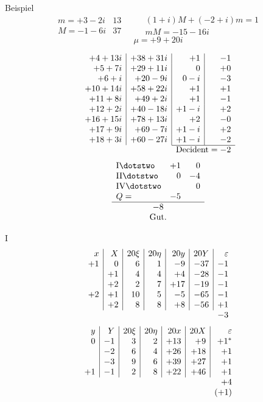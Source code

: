 Beispiel
\[
\begin{array}{r|r}
m=+3-2i&13\\
M=-1-6i&37
\end{array}
\qquad
\begin{gathered}
(1+i)M+(-2+i)m=1\\
mM=-15-16i
\end{gathered}
\]
\[
\mu=+9+20i
\]

\[
\begin{array}{r|r|r|r}
+4+13i&+38+31i&+1&-1\\
+5+7i&+29+11i&0&+0\\
+6+i&+20-9i&0-i&-3\\
+10+14i&+58+22i&+1&+1\\
+11+8i&+49+2i&+1&-1\\
+12+2i&+40-18i&+1-i&+2\\
+16+15i&+78+13i&+2&-0\\
+17+9i&+69-7i&+1-i&+2\\
+18+3i&+60-27i&+1-i&-2\\ \cline{3-4}
\multicolumn{2}{c}{}&\multicolumn{2}{c}{\text{Decident}=-2}
\end{array}
\]
\[
\begin{array}{lrr}
\mathrm{I}\dotstwo&+1&0\\
\mathrm{II}\dotstwo&0&-4\\
\mathrm{IV}\dotstwo&&0\\
Q=&-5&\\ \hline
\multicolumn{3}{c}{-8}\\
\multicolumn{3}{c}{\text{Gut.}}
\end{array}
\]

\noindent I
\[
\begin{array}{r|r|r|r|r|r|r}
x&X&20\xi&20\eta&20y&20Y&\varepsilon\\
+1&0&6&1&-9&-37&-1\\
&+1&4&4&+4&-28&-1\\
&+2&2&7&+17&-19&-1\\
+2&+1&10&5&-5&-65&-1\\
&+2&8&8&+8&-56&+1\\
\multicolumn{6}{c}{}&-3
\end{array}
\]
\[
\begin{array}{r|r|r|r|r|r|r}
y&Y&20\xi&20\eta&20x&20X&\varepsilon\\
0&-1&3&2&+13&+9&+1^{*}\\
&-2&6&4&+26&+18&+1\\
&-3&9&6&+39&+27&+1\\
+1&-1&2&8&+22&+46&+1\\
\multicolumn{6}{c}{}&+4\\
\multicolumn{6}{c}{}&(+1)
\end{array}
\]

